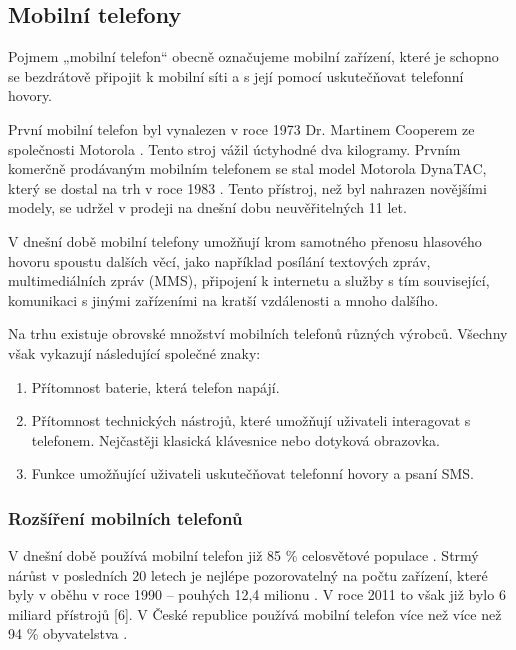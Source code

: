 \subsection{Mobilní telefony}
Pojmem „mobilní telefon“ obecně označujeme mobilní zařízení, které je schopno se bezdrátově připojit k mobilní síti a s její pomocí uskutečňovat telefonní hovory.

První mobilní telefon byl vynalezen v roce 1973 Dr. Martinem Cooperem ze společnosti Motorola \cite{bbc_inventor_of_mobile_phone}. Tento stroj vážil úctyhodné dva kilogramy. Prvním komerčně prodávaným mobilním telefonem se stal model Motorola DynaTAC, který se dostal na trh v roce 1983 \cite{motorola_dynatac}. Tento přístroj, než byl nahrazen novějšími modely, se udržel v prodeji na dnešní dobu neuvěřitelných 11 let.

V dnešní době mobilní telefony umožňují krom samotného přenosu hlasového hovoru spoustu dalších věcí, jako například posílání textových zpráv, multimediálních zpráv (MMS), připojení k internetu a služby s tím související, komunikaci s jinými zařízeními na kratší vzdálenosti a mnoho dalšího.

Na trhu existuje obrovské množství mobilních telefonů různých výrobců. Všechny však vykazují následující společné znaky:

\begin{enumerate}
	\item Přítomnost baterie, která telefon napájí.
	\item Přítomnost technických nástrojů, které umožňují uživateli interagovat s telefonem. Nejčastěji klasická klávesnice nebo dotyková obrazovka.
	\item Funkce umožňující uživateli uskutečňovat telefonní hovory a psaní SMS.
\end{enumerate}

\subsubsection{Rozšíření mobilních telefonů}
V dnešní době používá mobilní telefon již 85 \% celosvětové populace \cite{ericsson_report_web}. Strmý nárůst v posledních 20 letech je nejlépe pozorovatelný na počtu zařízení, které byly v oběhu v roce 1990 – pouhých 12,4 milionu \cite{csu_informacni_technologie_v_domacnostech}. V roce 2011 to však již bylo 6 miliard přístrojů [6]. V České republice používá mobilní telefon více než více než 94 \% obyvatelstva \cite{csu_informacni_technologie_v_domacnostech}. 

